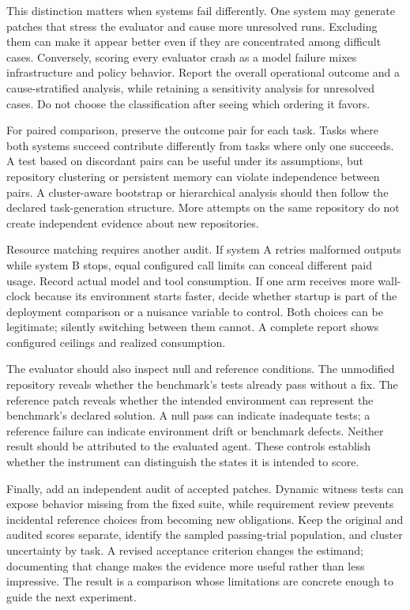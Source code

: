 This distinction matters when systems fail differently. One system may generate patches that stress the evaluator and cause more unresolved runs. Excluding them can make it appear better even if they are concentrated among difficult cases. Conversely, scoring every evaluator crash as a model failure mixes infrastructure and policy behavior. Report the overall operational outcome and a cause-stratified analysis, while retaining a sensitivity analysis for unresolved cases. Do not choose the classification after seeing which ordering it favors.

For paired comparison, preserve the outcome pair for each task. Tasks where both systems succeed contribute differently from tasks where only one succeeds. A test based on discordant pairs can be useful under its assumptions, but repository clustering or persistent memory can violate independence between pairs. A cluster-aware bootstrap or hierarchical analysis should then follow the declared task-generation structure. More attempts on the same repository do not create independent evidence about new repositories.

Resource matching requires another audit. If system A retries malformed outputs while system B stops, equal configured call limits can conceal different paid usage. Record actual model and tool consumption. If one arm receives more wall-clock because its environment starts faster, decide whether startup is part of the deployment comparison or a nuisance variable to control. Both choices can be legitimate; silently switching between them cannot. A complete report shows configured ceilings and realized consumption.

The evaluator should also inspect null and reference conditions. The unmodified repository reveals whether the benchmark's tests already pass without a fix. The reference patch reveals whether the intended environment can represent the benchmark's declared solution. A null pass can indicate inadequate tests; a reference failure can indicate environment drift or benchmark defects. Neither result should be attributed to the evaluated agent. These controls establish whether the instrument can distinguish the states it is intended to score.

Finally, add an independent audit of accepted patches. Dynamic witness tests can expose behavior missing from the fixed suite, while requirement review prevents incidental reference choices from becoming new obligations. Keep the original and audited scores separate, identify the sampled passing-trial population, and cluster uncertainty by task. A revised acceptance criterion changes the estimand; documenting that change makes the evidence more useful rather than less impressive. The result is a comparison whose limitations are concrete enough to guide the next experiment.

